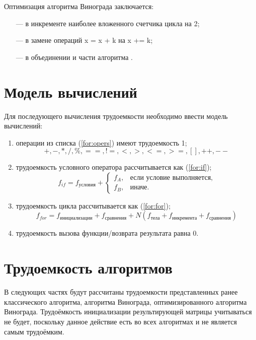 \clearpage

Оптимизация алгоритма Винограда заключается:
\begin{itemize}
	\item[---] в инкременте наиболее вложенного счетчика цикла на 2;
	\item[---] в замене операций x = x + k на x += k;
	\item[---] в объединении  и  части алгоритма .
\end{itemize}

\section{Модель вычислений}
Для последующего вычисления трудоемкости необходимо ввести модель вычислений:
\begin{enumerate}
	\item операции из списка (\ref{for:opers}) имеют трудоемкость 1;
	\begin{equation}
		\label{for:opers}
		+, -, *, /, \%, ==, !=, <, >, <=, >=, [], ++, {-}-
	\end{equation}
	\item трудоемкость условного оператора  рассчитывается как (\ref{for:if});
	\begin{equation}
		\label{for:if}
		f_{if} = f_{\text{условия}} +
		\begin{cases}
			f_A, & \text{если условие выполняется,}\\
			f_B, & \text{иначе.}
		\end{cases}
	\end{equation}
	\item трудоемкость цикла рассчитывается как (\ref{for:for});
	\begin{equation}
		\label{for:for}
		f_{for} = f_{\text{инициализации}} + f_{\text{сравнения}} + N(f_{\text{тела}} + f_{\text{инкремента}} + f_{\text{сравнения}})
	\end{equation}
	\item трудоемкость вызова функции/возврата результата равна 0.
\end{enumerate}


\section{Трудоемкость алгоритмов}
В следующих частях будут рассчитаны трудоемкости представленных ранее классического алгоритма, алгоритма Винограда, оптимизированного алгоритма Винограда.
Трудоёмкость инициализации результирующей матрицы учитываться не будет, поскольку данное действие есть во всех алгоритмах и не является самым трудоёмким.

